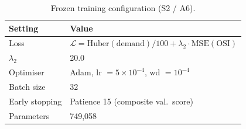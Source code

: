 \begin{table}[!t]
\caption{Frozen training configuration (S2 / A6).}
\label{tab:2}
\centering
\small
\renewcommand{\arraystretch}{1.2}
\begin{tabular}{|l|l|}
\hline
\textbf{Setting} & \textbf{Value} \\
\hline
Loss & $\mathcal{L} = \mathrm{Huber(demand)}/100 + \lambda_2 \cdot \mathrm{MSE(OSI)}$ \\
$\lambda_2$ & 20.0 \\
Optimiser & Adam, lr $= 5\times 10^{-4}$, wd $= 10^{-4}$ \\
Batch size & 32 \\
Early stopping & Patience 15 (composite val.\ score) \\
Parameters & 749,058 \\
\hline
\end{tabular}
\end{table}

